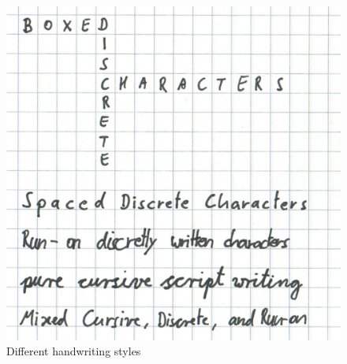 \begin{figure}[htbp]
\begin{center}
\includegraphics[scale=0.3]{images/differentHandwritingStylesSelfmade.png}
\caption{Different handwriting styles}
\label{fig:differenthandwritingstyles}
\end{center}
\end{figure}


